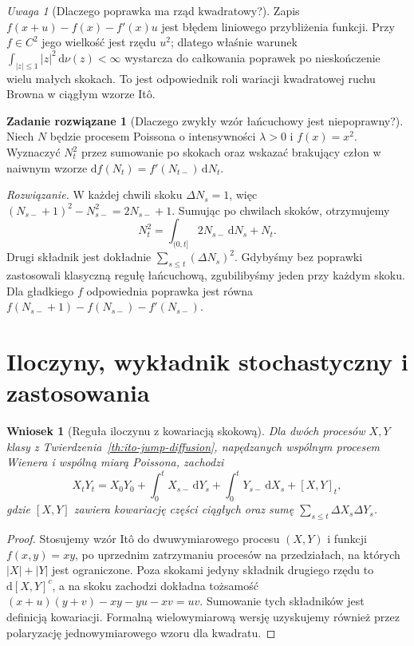 \documentclass[11pt,a4paper,oneside]{report}
\numberwithin{equation}{chapter}
\theoremstyle{plain}
\newtheorem{wniosek}[twierdzenie]{Wniosek}
\theoremstyle{definition}
\newtheorem{zadanie}{Zadanie rozwiązane}[chapter]
\theoremstyle{remark}
\newtheorem{uwaga}{Uwaga}[chapter]
\newcommand{\dd}{\mathrm{d}}
\begin{document}
\begin{uwaga}[Dlaczego poprawka ma rząd kwadratowy?]
Zapis $f(x+u)-f(x)-f'(x)u$ jest błędem liniowego
przybliżenia funkcji. Przy $f\in C^2$ jego wielkość jest
rzędu $u^2$; dlatego właśnie warunek
$\int_{|z|\le1}|z|^2\,\dd\nu(z)<\infty$
wystarcza do całkowania poprawek po nieskończenie wielu
małych skokach. To jest odpowiednik roli wariacji
kwadratowej ruchu Browna w ciągłym wzorze Itô.
\end{uwaga}

\begin{zadanie}[Dlaczego zwykły wzór łańcuchowy jest niepoprawny?]
Niech $N$ będzie procesem Poissona o intensywności
$\lambda>0$ i $f(x)=x^2$. Wyznaczyć $N_t^2$ przez
sumowanie po skokach oraz wskazać brakujący człon
w naiwnym wzorze $\dd f(N_t)=f'(N_{t-})\,\dd N_t$.

\emph{Rozwiązanie.} W każdej chwili skoku $\Delta N_s=1$,
więc $(N_{s-}+1)^2-N_{s-}^2=2N_{s-}+1$.
Sumując po chwilach skoków, otrzymujemy
\[
N_t^2=\int_{(0,t]}2N_{s-}\,\dd N_s+N_t.
\]
Drugi składnik jest dokładnie
$\sum_{s\le t}(\Delta N_s)^2$.
Gdybyśmy bez poprawki zastosowali klasyczną
regułę łańcuchową, zgubilibyśmy jeden przy każdym skoku.
Dla gładkiego $f$ odpowiednia poprawka jest równa
$f(N_{s-}+1)-f(N_{s-})-f'(N_{s-})$.
\end{zadanie}

\section{Iloczyny, wykładnik stochastyczny i zastosowania}\label{sec:volIII:12:06}

\begin{wniosek}[Reguła iloczynu z kowariacją skokową]\label{cor:volIII:12:01}
\label{cor:jump-product}
Dla dwóch procesów $X,Y$ klasy z
Twierdzenia~\ref{th:ito-jump-diffusion}, napędzanych
wspólnym procesem Wienera i wspólną miarą Poissona,
zachodzi
\[
X_tY_t=X_0Y_0+\int_0^tX_{s-}\,\dd Y_s
+\int_0^tY_{s-}\,\dd X_s+[X,Y]_t,
\]
gdzie $[X,Y]$ zawiera kowariację części ciągłych
oraz sumę $\sum_{s\le t}\Delta X_s\Delta Y_s$.
\end{wniosek}
\begin{proof}
Stosujemy wzór Itô do dwuwymiarowego procesu
$(X,Y)$ i funkcji $f(x,y)=xy$, po uprzednim zatrzymaniu
procesów na przedziałach, na których $|X|+|Y|$ jest
ograniczone. Poza skokami jedyny składnik drugiego
rzędu to $\dd[X,Y]^c$, a na skoku zachodzi dokładna
tożsamość
$(x+u)(y+v)-xy-yu-xv=uv$.
Sumowanie tych składników jest definicją kowariacji.
Formalną wielowymiarową wersję uzyskujemy również
przez polaryzację jednowymiarowego wzoru dla kwadratu.
\end{proof}
\end{document}

